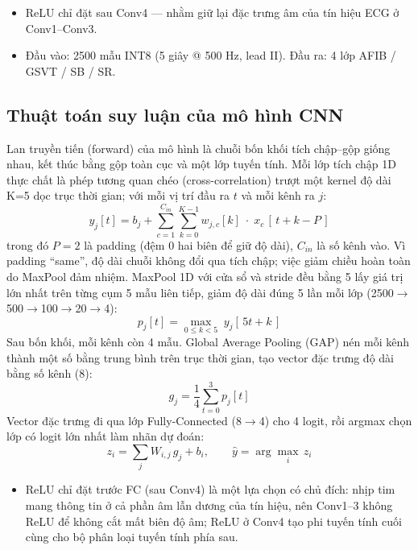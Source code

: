 \documentclass[12pt,a4paper]{article}
\begin{document}
\begin{itemize}
  \item ReLU chỉ đặt sau Conv4 --- nhằm giữ lại đặc trưng âm của tín hiệu ECG ở Conv1--Conv3.
  \item Đầu vào: 2500 mẫu INT8 (5 giây @ 500 Hz, lead II). Đầu ra: 4 lớp AFIB / GSVT / SB / SR.
\end{itemize}

\subsection{Thuật toán suy luận của mô hình CNN}

Lan truyền tiến (forward) của mô hình là chuỗi bốn khối tích chập--gộp giống nhau, kết thúc
bằng gộp toàn cục và một lớp tuyến tính. Mỗi lớp tích chập 1D thực chất là phép tương quan
chéo (cross-correlation) trượt một kernel độ dài K=5 dọc trục thời gian; với mỗi vị trí đầu
ra $t$ và mỗi kênh ra $j$:
\begin{equation}
  y_j[t] = b_j + \sum_{c=1}^{C_{in}} \sum_{k=0}^{K-1} w_{j,c}[k]\;\cdot\;x_c\,[\,t + k - P\,]
\end{equation}
trong đó $P=2$ là padding (đệm 0 hai biên để giữ độ dài), $C_{in}$ là số kênh vào. Vì padding
``same'', độ dài chuỗi không đổi qua tích chập; việc giảm chiều hoàn toàn do MaxPool đảm
nhiệm. MaxPool 1D với cửa sổ và stride đều bằng 5 lấy giá trị lớn nhất trên từng cụm 5 mẫu
liên tiếp, giảm độ dài đúng 5 lần mỗi lớp (2500$\rightarrow$500$\rightarrow$100$\rightarrow$20$\rightarrow$4):
\begin{equation}
  p_j[t] = \max_{0 \le k < 5}\; y_j[\,5t + k\,]
\end{equation}
Sau bốn khối, mỗi kênh còn 4 mẫu. Global Average Pooling (GAP) nén mỗi kênh thành một số bằng
trung bình trên trục thời gian, tạo vector đặc trưng độ dài bằng số kênh (8):
\begin{equation}
  g_j = \frac{1}{4}\sum_{t=0}^{3} p_j[t]
\end{equation}
Vector đặc trưng đi qua lớp Fully-Connected (8$\rightarrow$4) cho 4 logit, rồi argmax chọn
lớp có logit lớn nhất làm nhãn dự đoán:
\begin{equation}
  z_i = \sum_{j} W_{i,j}\,g_j + b_i, \qquad \hat{y} = \arg\max_i\, z_i
\end{equation}
\begin{itemize}
  \item ReLU chỉ đặt trước FC (sau Conv4) là một lựa chọn có chủ đích: nhịp tim mang thông tin
        ở cả phần âm lẫn dương của tín hiệu, nên Conv1--3 không ReLU để không cắt mất biên độ
        âm; ReLU ở Conv4 tạo phi tuyến tính cuối cùng cho bộ phân loại tuyến tính phía sau.
\end{itemize}
\end{document}
